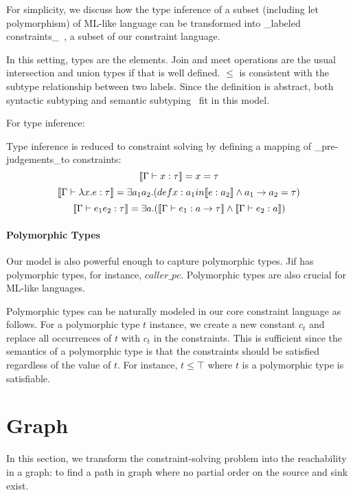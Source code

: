 For simplicity, we discuss how the type inference of a subset
(including let polymorphism) of ML-like language can be transformed
into _labeled constraints_~\cite{haack:slicing}, a subset of our
constraint language.

In this setting, types are the elements. Join and
meet operations are the usual intersection and union types if that is
well defined.
$\leq$ is consistent with the subtype relationship between two labels.
Since the definition is abstract, both syntactic subtyping 
and semantic subtyping~\cite{aiken-typeinclusion} fit in this model.

For type inference:

Type inference is reduced to constraint solving by defining a mapping
of _pre-judgements_to constraints:
\[\llbracket \Gamma \vdash x:\tau \rrbracket = x =\tau\]
\[\llbracket \Gamma \vdash \lambda x.e:\tau \rrbracket = \exists a_1 a_2.
(def x: a_1 in \llbracket e:a_2 \rrbracket \land a_1 \rightarrow a_2 =\tau)\]
\[\llbracket \Gamma\vdash e_1 e_2 : \tau \rrbracket = \exists a.(\llbracket \Gamma \vdash
e_1:a\rightarrow \tau \rrbracket\land \llbracket \Gamma\vdash e_2:a \rrbracket)\]


\paragraph{Polymorphic Types}

Our model is also powerful enough to capture polymorphic types.  Jif
has polymorphic types, for instance, $caller\_pc$. Polymorphic types
are also crucial for ML-like languages.

Polymorphic types can be naturally modeled in our core constraint
language as follows. For a polymorphic type $t$ instance, we create a
new constant $c_t$ and replace all occurrences of $t$ with $c_t$ in
the constraints. This is sufficient since the semantics of a
polymorphic type is that the constraints should be satisfied
regardless of the value of $t$. For instance, $t\leq \top$ where $t$
is a polymorphic type is satisfiable.

\section{Graph} 
\label{sec:graph}

In this section, we transform the constraint-solving problem into the
reachability in a graph: to find a path in graph where no partial order on the
source and sink exist. 

